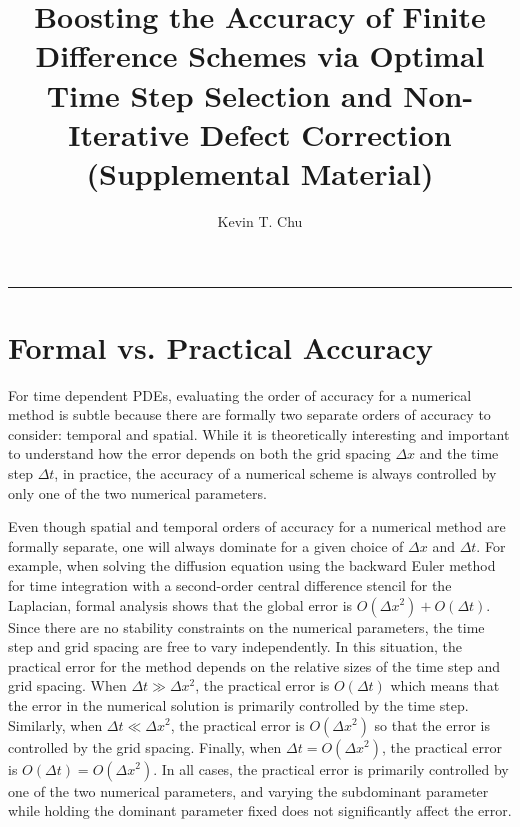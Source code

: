 \documentclass[fleqn,12pt,twoside]{article}
\def\dt{\Delta t}
\def\dx{\Delta x}
\begin{document}


\title{Boosting the Accuracy of Finite Difference Schemes via Optimal Time
Step Selection and Non-Iterative Defect Correction \\
(Supplemental Material)}

\author{Kevin T. Chu\address{Serendipity Research, Mountain View, CA 94041, United States}
}

\maketitle

\noindent \rule{6.3in}{1pt}

\appendix
\section{Formal vs. Practical Accuracy
         \label{app:formal_vs_practical_accuracy} }
For time dependent PDEs, evaluating the order of accuracy for a numerical
method is subtle because there are formally two separate orders of accuracy 
to consider:  temporal and spatial.  While it is theoretically
interesting and important to understand how the error depends on both the 
grid spacing $\dx$ and the time step $\dt$, in practice, the accuracy 
of a numerical scheme is always controlled by only one of the two numerical
parameters.  

Even though spatial and temporal orders of accuracy for a numerical method
are formally separate, one will always dominate for a given choice of 
$\dx$ and $\dt$.  For example, when solving the diffusion equation 
using the backward Euler method for time integration with a second-order 
central difference stencil for the Laplacian, formal analysis shows that 
the global error is $O(\dx^2) + O(\dt)$.  Since there are no 
stability constraints on the numerical parameters, the time
step and grid spacing are free to vary independently.  In this situation, the 
practical error for the method depends on the relative sizes of the time step 
and grid spacing.  When $\dt \gg \dx^2$, the practical error is 
$O(\dt)$ which means that the error in the numerical solution is 
primarily controlled by the time step.  Similarly, when 
$\dt \ll \dx^2$, the practical error is $O(\dx^2)$ so that 
the error is controlled by the grid spacing.  Finally, when 
$\dt  = O(\dx^2)$, the practical error is 
$O(\dt) = O(\dx^2)$.  In all cases, the practical error is 
primarily controlled by one of the two numerical parameters, and varying
the subdominant parameter while holding the dominant parameter fixed does 
not significantly affect the error.
 
\end{document}

